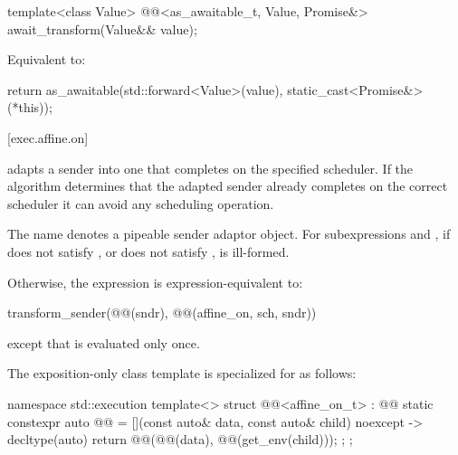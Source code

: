 %
\begin{itemdecl}
template<class Value>
@@<as_awaitable_t, Value, Promise&> await_transform(Value&& value);
\end{itemdecl}

\begin{itemdescr}
\pnum
\effects
Equivalent to:
\begin{codeblock}
return as_awaitable(std::forward<Value>(value), static_cast<Promise&>(*this));
\end{codeblock}
\end{itemdescr}

[exec.affine.on]{}

\pnum
{} adapts a sender into one that completes on
the specified scheduler.
If the algorithm determines that the adapted sender already completes
on the correct scheduler it can avoid any scheduling operation.

\pnum
The name  denotes a pipeable sender adaptor
object.
For subexpressions  and , if 
does not satisfy , or 
does not satisfy , 
is ill-formed.

\pnum
Otherwise, the expression  is
expression-equivalent to:
\begin{codeblock}
transform_sender(@@(sndr), @@(affine_on, sch, sndr))
\end{codeblock}
except that  is evaluated only once.

\pnum
The exposition-only class template 
is specialized for  as follows:

\begin{codeblock}
namespace std::execution {
  template<>
  struct @@<affine_on_t> : @@ {
    static constexpr auto @@ =
      [](const auto& data, const auto& child) noexcept -> decltype(auto) {
        return @@(@@(data), @@(get_env(child)));
      };
  };
}
\end{codeblock}

